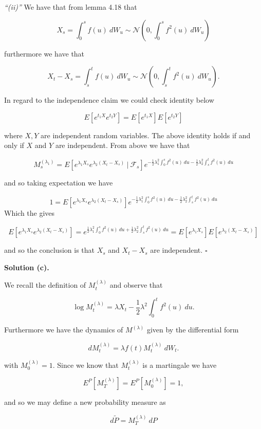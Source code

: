 \documentclass[a4paper,12pt,openany]{book}
\begin{document}
\emph{``(ii)''} We have that from lemma 4.18 that

\[
X_s=\int_0^sf(u)\ dW_u\sim \mathcal{N}\left(0,\int_0^sf^2(u)\ dW_u\right)
\]

furthermore we have that

\[
X_t-X_s=\int_s^tf(u)\ dW_u\sim \mathcal{N}\left(0,\int_s^tf^2(u)\ dW_u\right).
\]

In regard to the independence claim we could check identity below

\[
E[e^{t_1X}e^{t_2 Y}]=E[e^{t_1X}]E[e^{t_2Y}]
\]

where \(X,Y\) are independent random variables. The above identity holds if and only if \(X\) and \(Y\) are independent. From above we have that

\[
M_s^{(\lambda_1)}=E[e^{\lambda_1X_s}e^{\lambda_2(X_t-X_s)}\ \vert\ \mathcal{F}_s]e^{-\frac{1}{2}\lambda_1^2\int_0^s f^2(u)\ du-\frac{1}{2}\lambda_2^2\int_s^t f^2(u)\ du}
\]

and so taking expectation we have

\[
1=E[e^{\lambda_1X_s}e^{\lambda_2(X_t-X_s)}]e^{-\frac{1}{2}\lambda_1^2\int_0^s f^2(u)\ du-\frac{1}{2}\lambda_2^2\int_s^t f^2(u)\ du}
\]
Which the gives

\[
E[e^{\lambda_1X_s}e^{\lambda_2(X_t-X_s)}]=e^{\frac{1}{2}\lambda_1^2\int_0^s f^2(u)\ du+\frac{1}{2}\lambda_2^2\int_s^t f^2(u)\ du}=E[e^{\lambda_1X_s}]E[e^{\lambda_2(X_t-X_s)}]
\]

and so the conclusion is that \(X_s\) and \(X_t-X_s\) are independent. \(\square\)

\noindent\makebox[\linewidth]{\rule{\textwidth}{0.4pt}}

\textbf{Solution (c).}

We recall the definition of \(M_t^{(\lambda)}\) and observe that

\[
\log M_t^{(\lambda)}=\lambda X_t-\frac{1}{2}\lambda ^2\int_0^t f^2(u)\ du.
\]

Furthermore we have the dynamics of \(M^{(\lambda)}\) given by the differential form

\[
dM_t^{(\lambda)}=\lambda f(t)M_t^{(\lambda)}\ dW_t.
\]

with \(M_0^{(\lambda)}=1\). Since we know that \(M_t^{(\lambda)}\) is a martingale we have

\[
E^P[M_T^{(\lambda)}]=E^P[M_0^{(\lambda)}]=1,
\]

and so we may define a new probability measure as

\[
d\tilde{P}=M_T^{(\lambda)}\ dP
\]
\end{document}
